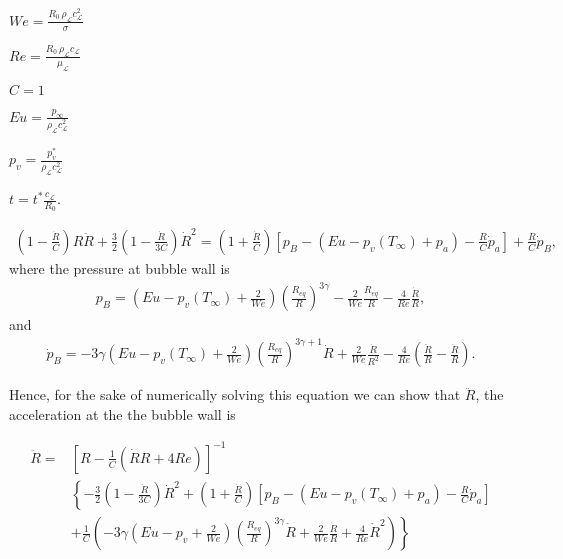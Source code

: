 %
\begin{center}
\begin{minipage}{.32\textwidth}
$We = \frac{R_0 \, \rho_\mathcal{L} c_\mathcal{L}^2}{\sigma}$
\end{minipage}
\begin{minipage}{.32\textwidth}
$Re = \frac{R_0 \, \rho_\mathcal{L} c_\mathcal{L}}{\mu_\mathcal{L}}$
\end{minipage}
\begin{minipage}{.32\textwidth}
$C = 1$
\end{minipage}
\vspace*{.5cm}
\begin{minipage}{.32\textwidth}
$Eu = \frac{p_\infty}{\rho_\mathcal{L} c_\mathcal{L}^2}$
\end{minipage}
\begin{minipage}{.32\textwidth}
$p_v = \frac{p_v^*}{\rho_\mathcal{L} c_\mathcal{L}^2}$
\end{minipage}
\begin{minipage}{.32\textwidth}
$t = t^*\frac{c_\mathcal{L}}{R_0}$.
\end{minipage}
\end{center}
%
\begin{align}\label{eq:keller}
  \left(1-\frac{\dot{R}}{C}\right) R \ddot{R} + \frac{3}{2}\left(1-\frac{\dot{R}}{3 C}\right) \dot{R}^2%
     = \left(1+\frac{\dot{R}}{C}\right) \left[p_B- (Eu-p_v(T_\infty)+p_a) -     \frac{R}{C}\dot{p}_a\right] +\frac{R}{C} \dot{p}_B,
\end{align}
%
where the pressure at bubble wall is 
%
\begin{align}\label{eq:bubble_pressure}
  p_B = \left(Eu-p_v(T_\infty)+\frac{2}{We}\right)\left(\frac{R_{eq}}{R}\right)^{3\gamma}-\frac{2}{We}\frac{R_{eq}}{R} -\frac{4}{Re}\frac{\dot{R}}{R},
\end{align}
%
and
%
\begin{align}\label{eq:bubble_pressure_dot}
  \dot{p}_B = -3\gamma \left(Eu-p_v(T_\infty)+\frac{2}{We}\right)\left(\frac{R_{eq}}{R}\right)^{3\gamma+1}\dot{R}+\frac{2}{We}\frac{\dot{R}}{R^2}
 -\frac{4}{Re}\left(\frac{\ddot{R}}{R}-\frac{\dot{R}}{R}\right).
\end{align}

Hence, for the sake of numerically solving this equation we can show that $\ddot{R}$, the acceleration at the the bubble wall is

\begin{align}\label{eq:bubble_accleration}
  \ddot{R} =&\left[R-\frac{1}{C}(\dot{R}{R}+4 Re)\right]^{-1}\nonumber \\ 
            &\left\{-\frac{3}{2}\left(1-\frac{\dot{R}}{3 C}\right) \dot{R}^2 + \left(1+\frac{\dot{R}}{C}\right) \left[p_B- (Eu-p_v(T_\infty)+p_a) -  \frac{R}{C}\dot{p}_a\right] \right.\\
            &\left.+\frac{1}{C} \left(-3\gamma\left(Eu-p_v+\frac{2}{We}\right)\left(\frac{R_{eq}}{R}\right)^{3\gamma}\dot{R}+\frac{2}{We}\frac{\dot{R}}{R}+\frac{4}{Re}\dot{R}^2\right)\right\}\nonumber
\end{align}

